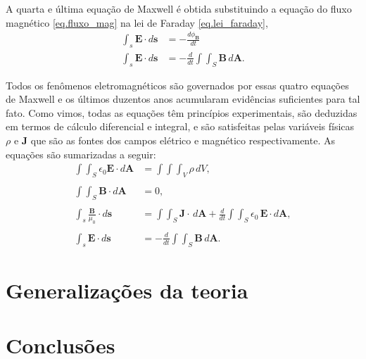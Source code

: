 A quarta e última equação de Maxwell é obtida substituindo a equação do fluxo magnético \ref{eq.fluxo_mag} na lei de Faraday \ref{eq.lei_faraday},
\begin{align*}
\int_s\pmb{E}\cdot d\pmb{s}&=-\frac{d\phi_\mathbf{B}}{dt}\\
\int_s\pmb{E}\cdot d\pmb{s}&=-\frac{d}{dt}\int\int_S\pmb{B}\,d\pmb{A}.
\end{align*}

Todos os fenômenos eletromagnéticos são governados por essas quatro equações de Maxwell  e os últimos duzentos anos acumularam evidências suficientes para tal fato. Como vimos, todas as equações têm princípios experimentais, são deduzidas em termos de cálculo diferencial e integral, e são satisfeitas pelas variáveis físicas $\rho$ e $\mathbf{J}$ que são as fontes dos campos elétrico e magnético respectivamente. As equações são sumarizadas a seguir:
\begin{align*}
\int\int_S\epsilon_0\textbf{E}\cdot\textit{d}\textbf{A}&=\int\int\int_{V}\rho\,dV,\\\\
\int\int_S\textbf{B}\cdot\textit{d}\textbf{A}&=0,\\\\
\int_s\frac{\mathbf{B}}{\mu_0}\cdot d\mathbf{s}&=\int\int_S\mathbf{J}\cdot\,d\mathbf{A}+\frac{d}{dt}\int\int_S\epsilon_0\,\textbf{E}\cdot\textit{d}\textbf{A},\\\\
\int_s\pmb{E}\cdot d\pmb{s}&=-\frac{d}{dt}\int\int_S\pmb{B}\,d\pmb{A}.
\end{align*}

\section{Generalizações da teoria}

\section{Conclusões}